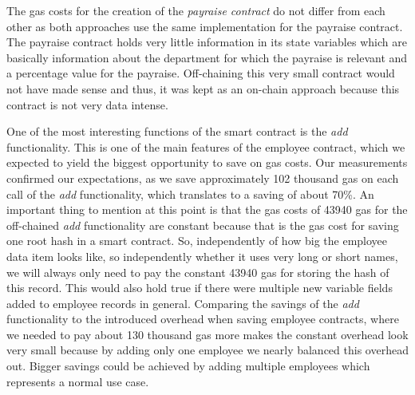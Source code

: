 The gas costs for the creation of the \textit{payraise contract} do not differ from each other as both approaches use the same implementation for the payraise contract.
The payraise contract holds very little information in its state variables which are basically information about the department for which the payraise is relevant and a percentage value for the payraise.
Off-chaining this very small contract would not have made sense and thus, it was kept as an on-chain approach because this contract is not very data intense.

One of the most interesting functions of the smart contract is the \textit{add} functionality.
This is one of the main features of the employee contract, which we expected to yield the biggest opportunity to save on gas costs.
Our measurements confirmed our expectations, as we save approximately 102 thousand gas on each call of the \textit{add} functionality, which translates to a saving of about 70\%.
An important thing to mention at this point is that the gas costs of 43940 gas for the off-chained \textit{add} functionality are constant because that is the gas cost for saving one root hash in a smart contract.
So, independently of how big the employee data item looks like, so independently whether it uses very long or short names, we will always only need to pay the constant 43940 gas for storing the hash of this record.
This would also hold true if there were multiple new variable fields added to employee records in general.
Comparing the savings of the \textit{add} functionality to the introduced overhead when saving employee contracts, where we needed to pay about 130 thousand gas more makes the constant overhead look very small because by adding only one employee we nearly balanced this overhead out.
Bigger savings could be achieved by adding multiple employees which represents a normal use case.

